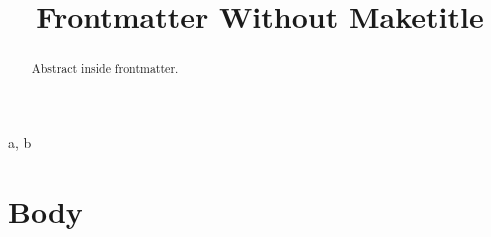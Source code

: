 \documentclass[preprint]{article}
\newenvironment{frontmatter}{}{}
\begin{document}
\begin{frontmatter}
\title{Frontmatter Without Maketitle}
\begin{abstract}
Abstract inside frontmatter.
\end{abstract}
\begin{keywords}
a, b
\end{keywords}
\end{frontmatter}
\section{Body}
\end{document}
